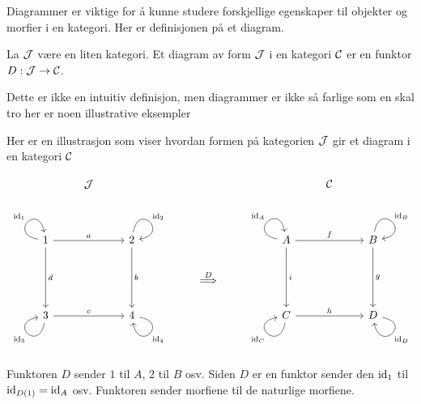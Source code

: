Diagrammer er viktige for å kunne studere forskjellige egenskaper til objekter og morfier i en kategori. Her er
definisjonen på et diagram.

\begin{definisjon}\label{def:Diagram}
  La $\mathcal{J}$ være en liten kategori. Et diagram av form $\mathcal{J}$
  i en kategori $\mathcal{C}$ er en funktor $D:\mathcal{J}\to\mathcal{C}$.
\end{definisjon}
Dette er ikke en intuitiv definisjon, men diagrammer er ikke så
farlige som en skal tro her er noen illustrative eksempler

\begin{eksempel}\label{ex:Diag1}
  Her er en illustrasjon som viser hvordan formen på kategorien
  $\mathcal{J}$ gir et diagram i en kategori $\mathcal{C}$

  \[\begin{tikzcd}
	& \Jcal &&&&&& \Ccal \\
	\\
	1 && 2 &&&& A && B \\
	&&&& {\stackrel{D}{\implies}} \\
	3 && 4 &&&& C && D
	\arrow["{\id_1}", from=3-1, to=3-1, loop, in=100, out=170, distance=10mm]
	\arrow["a", from=3-1, to=3-3]
	\arrow["d", from=3-1, to=5-1]
	\arrow["{\id_2}", from=3-3, to=3-3, loop, in=10, out=80, distance=10mm]
	\arrow["b", from=3-3, to=5-3]
	\arrow["{\id_A}", from=3-7, to=3-7, loop, in=100, out=170, distance=10mm]
	\arrow["f", from=3-7, to=3-9]
	\arrow["i", from=3-7, to=5-7]
	\arrow["{\id_B}", from=3-9, to=3-9, loop, in=10, out=80, distance=10mm]
	\arrow["g", from=3-9, to=5-9]
	\arrow["{\id_3}", from=5-1, to=5-1, loop, in=190, out=260, distance=10mm]
	\arrow["c", from=5-1, to=5-3]
	\arrow["{\id_4}", from=5-3, to=5-3, loop, in=280, out=350, distance=10mm]
	\arrow["{\id_C}", from=5-7, to=5-7, loop, in=190, out=260, distance=10mm]
	\arrow["h", from=5-7, to=5-9]
	\arrow["{\id_D}", from=5-9, to=5-9, loop, in=280, out=350, distance=10mm]
\end{tikzcd}\]

Funktoren $D$ sender $1$ til $A$, $2$ til $B$ osv. Siden $D$ er en funktor
  sender den $\textnormal{id}_1$ til $\textnormal{id}_{D(1)}=\textnormal{id}_A$ osv. Funktoren sender
  morfiene til de naturlige morfiene.
\end{eksempel}

